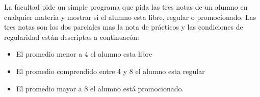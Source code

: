 La facultad pide un simple programa que pida las tres notas de un alumno en cualquier materia y mostrar si el alumno esta libre, regular o promocionado. Las tres notas son los dos parciales mas la nota de prácticos y las condiciones de regularidad están descriptas a continuacón:

\begin{itemize}
	\item El promedio menor a 4 el alumno esta libre
	\item El promedio comprendido entre 4 y 8 el alumno esta regular
	\item El promedio mayor a 8 el alumno está promocionado.
\end{itemize}